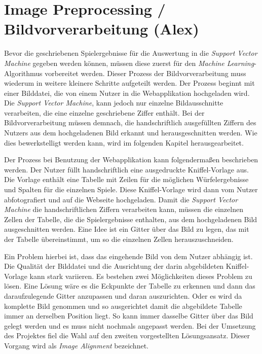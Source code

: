 \section{Image Preprocessing / Bildvorverarbeitung (Alex)} \label{sec:imagepreprocessing}
Bevor die geschriebenen Spielergebnisse für die Auswertung in die \textit{Support Vector Machine} gegeben werden können, müssen diese zuerst
für den \textit{Machine Learning}-Algorithmus vorbereitet werden. Dieser Prozess der Bildvorverarbeitung muss wiederum in weitere kleinere
Schritte aufgeteilt werden. Der Prozess beginnt mit einer Bilddatei, die von einem Nutzer in die Webapplikation hochgeladen wird. 
Die \textit{Support Vector Machine}, kann jedoch nur einzelne Bildausschnitte verarbeiten, die eine einzelne geschriebene Ziffer enthält.
Bei der Bildvorverarbeitung müssen demnach, die handschriftlich ausgefüllten Ziffern des Nutzers aus dem hochgeladenen Bild erkannt und
herausgeschnitten werden. Wie dies bewerkstelligt werden kann, wird im folgenden Kapitel herausgearbeitet.

Der Prozess bei Benutzung der Webapplikation kann folgendermaßen beschrieben werden. Der Nutzer füllt handschriftlich eine ausgedruckte Kniffel-Vorlage aus.
Die Vorlage enthält eine Tabelle mit Zeilen für die möglichen Würfelergebnisse und Spalten für die einzelnen Spiele. Diese Kniffel-Vorlage 
wird dann vom Nutzer abfotografiert und auf die Webseite hochgeladen. Damit die \textit{Support Vector Machine} die handschriftlichen Ziffern verarbeiten kann,
müssen die einzelnen Zellen der Tabelle, die die Spielergebnisse enthalten, aus dem hochgeladenen Bild ausgeschnitten werden. Eine Idee ist
ein Gitter über das Bild zu legen, das mit der Tabelle übereinstimmt, um so die einzelnen Zellen herauszuschneiden.

Ein Problem hierbei ist, dass das eingehende Bild von dem Nutzer abhängig ist. Die Qualität der Bilddatei und die Ausrichtung der darin abgebildeten 
Kniffel-Vorlage kann stark variieren. Es bestehen zwei Möglichkeiten dieses Problem zu lösen. Eine Lösung wäre es die Eckpunkte der Tabelle zu erkennen und 
dann das daraufzulegende Gitter anzupassen und daran auszurichten. Oder es wird da komplette Bild genommen und so ausgerichtet damit die abgebildete Tabelle
immer an derselben Position liegt. So kann immer dasselbe Gitter über das Bild gelegt werden und es muss nicht nochmals angepasst werden.
Bei der Umsetzung des Projektes fiel die Wahl auf den zweiten vorgestellten Lösungsansatz. Dieser Vorgang wird als \textit{Image Alignment} bezeichnet.

